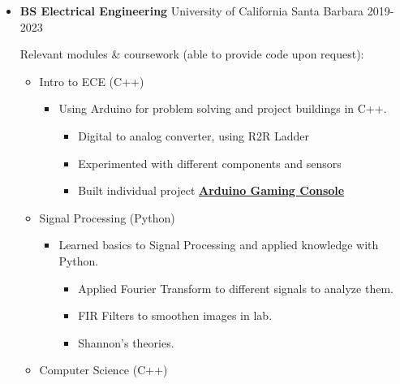   \begin{itemize}
    \def\ongoing{%
    }
    \item \ongoing{} \textbf{BS Electrical Engineering} \dashdiv{} University of California Santa Barbara \dashdiv{} 2019-2023

      Relevant modules \& coursework (able to provide code upon request):

      \begin{itemize}

        \item Intro to ECE (C++)

        \begin{itemize}
          \item Using Arduino for problem solving and project buildings in C++.

          \begin{itemize}
            \item Digital to analog converter, using R2R Ladder
            \item Experimented with different components and sensors
            \item Built individual project \dashdiv{} \href{https://github.com/RustColeone/OLEDGameConsole}{\color{link}\textbf{Arduino Gaming Console}} 
          \end{itemize}
        \end{itemize}

        \item Signal Processing (Python)

        \begin{itemize}
          \item Learned basics to Signal Processing and applied knowledge with Python.
          \begin{itemize}
            \item Applied Fourier Transform to different signals to analyze them.
            \item FIR Filters to smoothen images in lab.
            \item Shannon's theories.
          \end{itemize}
        \end{itemize}

        \item Computer Science (C++)


\end{itemize}
\end{itemize}
